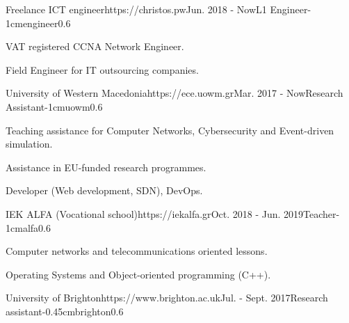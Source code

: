 \documentclass{mycv}
\begin{document}
	\vspace*{0.5cm}
	
	\begin{EntryDatedLogo}{Freelance ICT engineer}{https://christos.pw}{Jun. 2018 - Now}{L1 Engineer}{-1cm}{engineer}{0.6}
		\begin{Itemize}
			\item VAT registered CCNA Network Engineer.
			\item Field Engineer for IT outsourcing companies.
		\end{Itemize}
	\end{EntryDatedLogo}

	\vspace*{0.5cm}	

	\begin{EntryDatedLogo}{University of Western Macedonia}{https://ece.uowm.gr}{Mar. 2017 - Now}{Research Assistant}{-1cm}{uowm}{0.6}
		\begin{Itemize}
			\item Teaching assistance for Computer Networks, Cybersecurity and Event-driven simulation.
			\item Assistance in EU-funded research programmes.
			\item Developer (Web development, SDN), DevOps. 
		\end{Itemize}
	\end{EntryDatedLogo}

	\vspace*{0.5cm}

	\begin{EntryDatedLogo}{IEK ALFA (Vocational school)}{https://iekalfa.gr}{Oct. 2018 - Jun. 2019}{Teacher}{-1cm}{alfa}{0.6}
		\begin{Itemize}
			\item Computer networks and telecommunications oriented lessons.
			\item Operating Systems and Object-oriented programming (C++).
		\end{Itemize}
	\end{EntryDatedLogo}

	\vspace*{0.5cm}
		
	\begin{EntryDatedLogo}{University of Brighton}{https://www.brighton.ac.uk}{Jul. - Sept. 2017}{Research assistant}{-0.45cm}{brighton}{0.6}
	\end{EntryDatedLogo}
\end{document}
